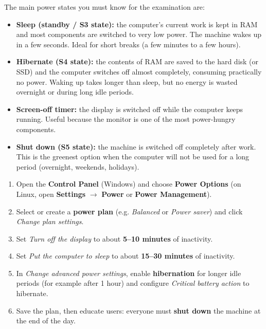 \documentclass[11pt]{article}
\begin{document}
The main power states you must know for the examination are:

\begin{itemize}
\item \textbf{Sleep (standby / S3 state):} the computer's current work is kept in RAM and most components are switched to very low power. The machine wakes up in a few seconds. Ideal for short breaks (a few minutes to a few hours).
\item \textbf{Hibernate (S4 state):} the contents of RAM are saved to the hard disk (or SSD) and the computer switches off almost completely, consuming practically no power. Waking up takes longer than sleep, but no energy is wasted overnight or during long idle periods.
\item \textbf{Screen-off timer:} the display is switched off while the computer keeps running. Useful because the monitor is one of the most power-hungry components.
\item \textbf{Shut down (S5 state):} the machine is switched off completely after work. This is the greenest option when the computer will not be used for a long period (overnight, weekends, holidays).
\end{itemize}

\begin{methode}
\begin{enumerate}
\item Open the \textbf{Control Panel} (Windows) and choose \textbf{Power Options} (on Linux, open \textbf{Settings} $\rightarrow$ \textbf{Power} or \textbf{Power Management}).
\item Select or create a \textbf{power plan} (e.g. \emph{Balanced} or \emph{Power saver}) and click \emph{Change plan settings}.
\item Set \emph{Turn off the display} to about \textbf{5--10 minutes} of inactivity.
\item Set \emph{Put the computer to sleep} to about \textbf{15--30 minutes} of inactivity.
\item In \emph{Change advanced power settings}, enable \textbf{hibernation} for longer idle periods (for example after 1 hour) and configure \emph{Critical battery action} to hibernate.
\item Save the plan, then educate users: everyone must \textbf{shut down} the machine at the end of the day.
\end{enumerate}
\end{methode}
\end{document}
